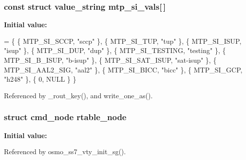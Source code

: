 \subsubsection[{mtp\+\_\+si\+\_\+vals}]{\setlength{\rightskip}{0pt plus 5cm}const struct value\+\_\+string mtp\+\_\+si\+\_\+vals[$\,$]}\label{osmo__ss7__vty_8c_a302af65ae379fd4c883fae04233ad551}
{\bfseries Initial value\+:}
\begin{DoxyCode}
= \{
        \{ MTP_SI_SCCP,          \textcolor{stringliteral}{"sccp"} \},
        \{ MTP_SI_TUP,           \textcolor{stringliteral}{"tup"} \},
        \{ MTP_SI_ISUP,          \textcolor{stringliteral}{"isup"} \},
        \{ MTP_SI_DUP,           \textcolor{stringliteral}{"dup"} \},
        \{ MTP_SI_TESTING,       \textcolor{stringliteral}{"testing"} \},
        \{ MTP_SI_B_ISUP,        \textcolor{stringliteral}{"b-isup"} \},
        \{ MTP_SI_SAT_ISUP,      \textcolor{stringliteral}{"sat-isup"} \},
        \{ MTP_SI_AAL2_SIG,      \textcolor{stringliteral}{"aal2"} \},
        \{ MTP_SI_BICC,          \textcolor{stringliteral}{"bicc"} \},
        \{ MTP_SI_GCP,           \textcolor{stringliteral}{"h248"} \},
        \{ 0, NULL \}
\}
\end{DoxyCode}


Referenced by \+\_\+rout\+\_\+key(), and write\+\_\+one\+\_\+as().

\subsubsection[{rtable\+\_\+node}]{\setlength{\rightskip}{0pt plus 5cm}struct cmd\+\_\+node rtable\+\_\+node\hspace{0.3cm}{\ttfamily [static]}}\label{osmo__ss7__vty_8c_a7e8e9206c234d28d7e1442be05dce397}
{\bfseries Initial value\+:}


Referenced by osmo\+\_\+ss7\+\_\+vty\+\_\+init\+\_\+sg().

